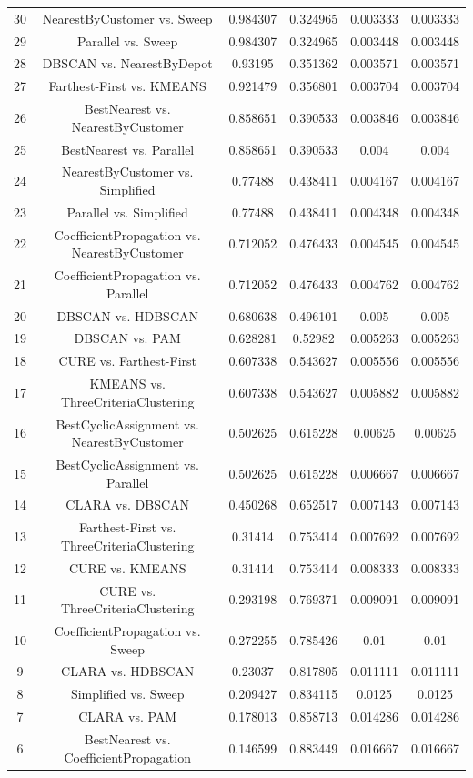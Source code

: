 \documentclass[a4paper,10pt]{article}
\begin{document}
\begin{landscape}
\begin{table}[!htp]
\begin{tabular}{cccccc}
30&NearestByCustomer vs. Sweep&0.984307&0.324965&0.003333&0.003333\\
29&Parallel vs. Sweep&0.984307&0.324965&0.003448&0.003448\\
28&DBSCAN vs. NearestByDepot&0.93195&0.351362&0.003571&0.003571\\
27&Farthest-First vs. KMEANS&0.921479&0.356801&0.003704&0.003704\\
26&BestNearest vs. NearestByCustomer&0.858651&0.390533&0.003846&0.003846\\
25&BestNearest vs. Parallel&0.858651&0.390533&0.004&0.004\\
24&NearestByCustomer vs. Simplified&0.77488&0.438411&0.004167&0.004167\\
23&Parallel vs. Simplified&0.77488&0.438411&0.004348&0.004348\\
22&CoefficientPropagation vs. NearestByCustomer&0.712052&0.476433&0.004545&0.004545\\
21&CoefficientPropagation vs. Parallel&0.712052&0.476433&0.004762&0.004762\\
20&DBSCAN vs. HDBSCAN&0.680638&0.496101&0.005&0.005\\
19&DBSCAN vs. PAM&0.628281&0.52982&0.005263&0.005263\\
18&CURE vs. Farthest-First&0.607338&0.543627&0.005556&0.005556\\
17&KMEANS vs. ThreeCriteriaClustering&0.607338&0.543627&0.005882&0.005882\\
16&BestCyclicAssignment vs. NearestByCustomer&0.502625&0.615228&0.00625&0.00625\\
15&BestCyclicAssignment vs. Parallel&0.502625&0.615228&0.006667&0.006667\\
14&CLARA vs. DBSCAN&0.450268&0.652517&0.007143&0.007143\\
13&Farthest-First vs. ThreeCriteriaClustering&0.31414&0.753414&0.007692&0.007692\\
12&CURE vs. KMEANS&0.31414&0.753414&0.008333&0.008333\\
11&CURE vs. ThreeCriteriaClustering&0.293198&0.769371&0.009091&0.009091\\
10&CoefficientPropagation vs. Sweep&0.272255&0.785426&0.01&0.01\\
9&CLARA vs. HDBSCAN&0.23037&0.817805&0.011111&0.011111\\
8&Simplified vs. Sweep&0.209427&0.834115&0.0125&0.0125\\
7&CLARA vs. PAM&0.178013&0.858713&0.014286&0.014286\\
6&BestNearest vs. CoefficientPropagation&0.146599&0.883449&0.016667&0.016667\\

\end{tabular}
\end{table}
\end{landscape}
\end{document}
